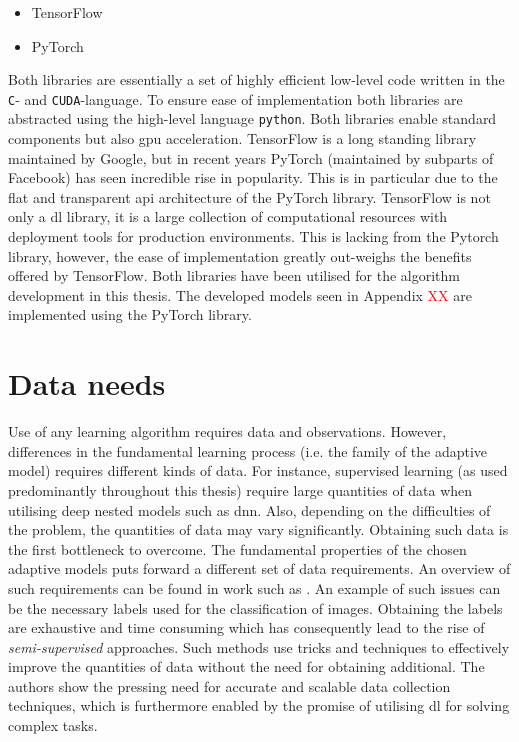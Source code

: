 \begin{itemize}
    \item TensorFlow \cite{tensorflow2015-whitepaper}
    \item PyTorch \cite{Paszke2017AutomaticPyTorch}
\end{itemize}

Both libraries are essentially a set of highly efficient low-level code written in the \texttt{C}- and \texttt{CUDA}-language. To ensure ease of implementation both libraries are abstracted using the high-level language \texttt{python}. Both libraries enable standard components but also \gls{gpu} acceleration. TensorFlow is a long standing library maintained by Google, but in recent years PyTorch (maintained by subparts of Facebook) has seen incredible rise in popularity. This is in particular due to the flat and transparent \gls{api} architecture of the PyTorch library. TensorFlow is not only a \gls{dl} library, it is a large collection of computational resources with deployment tools for production environments. This is lacking from the Pytorch library, however, the ease of implementation greatly out-weighs the benefits offered by TensorFlow. Both libraries have been utilised for the algorithm development in this thesis. The developed models seen in Appendix \textcolor{red}{XX} are implemented using the PyTorch library.

\section{Data needs}

Use of any learning algorithm requires data and observations. However, differences in the fundamental learning process (i.e. the family of the adaptive model) requires different kinds of data. For instance, supervised learning (as used predominantly throughout this thesis) require large quantities of data when utilising deep nested models such as \gls{dnn}. Also, depending on the difficulties of the problem, the quantities of data may vary significantly. Obtaining such data is the first bottleneck to overcome. The fundamental properties of the chosen adaptive models puts forward a different set of data requirements. An overview of such requirements can be found in work such as \cite{RohAPerspective}. An example of such issues can be the necessary labels used for the classification of images. Obtaining the labels are exhaustive and time consuming which has consequently lead to the rise of \emph{semi-supervised} approaches. Such methods use tricks and techniques to effectively improve the quantities of data without the need for obtaining additional. The authors show the pressing need for accurate and scalable data collection techniques, which is furthermore enabled by the promise of utilising \gls{dl} for solving complex tasks. 

